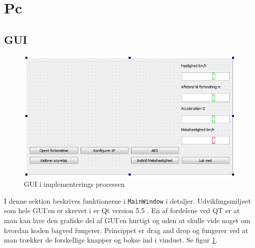 \section{Pc}
\subsection{GUI}
\begin{figure}[H]
\centering
\includegraphics[width=\textwidth* 3/4,height=\textwidth* 9/20 ]{../fig/billeder/gui_design.png}
\caption{GUI i implementerings processen}
\label{fig:GUI_design}
\end{figure}
I denne sektion beskrives funktionerne i \texttt{MainWindow} i detaljer. Udviklingsmiljøet som hele GUI'en er skrevet i er Qt version 5.5 \cite{lib:qt}. En af fordelene ved QT er at man kan lave den grafiske del af GUI'en hurtigt og uden at skulle vide noget om hvordan koden bagved fungerer. Princippet er drag and drop og fungerer ved at man trækker de forskellige knapper og bokse ind i vinduet. Se figur \ref{fig:GUI_design}.
